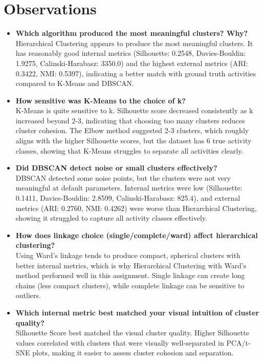 \documentclass[11pt]{article}
\begin{document}
\section{Observations}
\begin{itemize}
    \item \textbf{Which algorithm produced the most meaningful clusters? Why?} \\
    Hierarchical Clustering appears to produce the most meaningful clusters. It has reasonably good internal metrics (Silhouette: 0.2548, Davies-Bouldin: 1.9275, Calinski-Harabasz: 3350.0) and the highest external metrics (ARI: 0.3422, NMI: 0.5397), indicating a better match with ground truth activities compared to K-Means and DBSCAN.

    \item \textbf{How sensitive was K-Means to the choice of k?} \\
    K-Means is quite sensitive to k. Silhouette score decreased consistently as k increased beyond 2-3, indicating that choosing too many clusters reduces cluster cohesion. The Elbow method suggested 2-3 clusters, which roughly aligns with the higher Silhouette scores, but the dataset has 6 true activity classes, showing that K-Means struggles to separate all activities clearly.

    \item \textbf{Did DBSCAN detect noise or small clusters effectively?} \\
    DBSCAN detected some noise points, but the clusters were not very meaningful at default parameters. Internal metrics were low (Silhouette: 0.1411, Davies-Bouldin: 2.8599, Calinski-Harabasz: 825.4), and external metrics (ARI: 0.2760, NMI: 0.4262) were worse than Hierarchical Clustering, showing it struggled to capture all activity classes effectively.

    \item \textbf{How does linkage choice (single/complete/ward) affect hierarchical clustering?} \\
    Using Ward’s linkage tends to produce compact, spherical clusters with better internal metrics, which is why Hierarchical Clustering with Ward’s method performed well in this assignment. Single linkage can create long chains (less compact clusters), while complete linkage can be sensitive to outliers.

    \item \textbf{Which internal metric best matched your visual intuition of cluster quality?} \\
    Silhouette Score best matched the visual cluster quality. Higher Silhouette values correlated with clusters that were visually well-separated in PCA/t-SNE plots, making it easier to assess cluster cohesion and separation.
\end{itemize}
\end{document}
